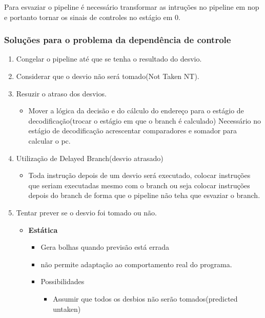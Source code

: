 \documentclass[a4paper]{article}
\begin{document}
    Para esvaziar o pipeline é necessário transformar as intruções no pipeline em nop e portanto tornar os sinais de
    controles no estágio em 0.

    \subsubsection{Soluções para o problema da dependência de controle}

    \begin{enumerate}
        \item Congelar o pipeline até que se tenha o resultado do desvio.
        \item Considerar que o desvio não será tomado(Not Taken NT).
        \item Resuzir o atraso dos desvios.
            \begin{itemize}
                \item Mover a lógica da decisão e do cálculo do endereço para o estágio de decodificação(trocar o
                    estágio em que o branch é calculado) Necessário no estágio de decodificação acrescentar comparadores
                    e somador para calcular o pc.
            \end{itemize}
        \item Utilização de Delayed Branch(desvio atrasado)
            \begin{itemize}
                \item Toda instrução depois de um desvio será executado, colocar instruções que seriam executadas mesmo
                        com o branch ou seja colocar instruções depois do branch de forma que o pipeline não teha que
                        esvaziar o branch.
            \end{itemize}
        \item Tentar prever se o desvio foi tomado ou não.
            \begin{itemize}
                \item \textbf{Estática}
                    \begin{itemize}
                        \item Gera bolhas quando previsão está errada
                        \item não permite adaptação ao comportamento real do programa.
                        \item Possibilidades
                            \begin{itemize}
                                \item Assumir que todos os desbios não serão tomados(predicted untaken)

\end{itemize}
\end{itemize}
\end{itemize}
\end{enumerate}
\end{document}
